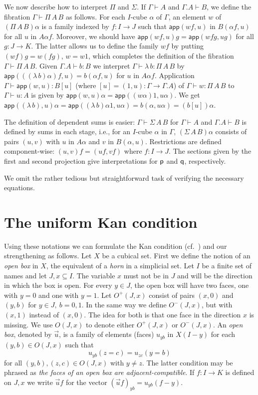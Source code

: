 \documentclass[10pt,a4paper]{article}
\newcommand{\app}{\mathsf{app}}
\newcommand{\pp}{{\sf p}}
\newcommand{\qq}{{\sf q}}
\begin{document}
We now describe how to interpret $\Pi$ and $\Sigma$. If $\Gamma\vdash
A$ and $\Gamma.A\vdash B$, we define the fibration $\Gamma\vdash
\Pi\,A\,B$ as follows.  For each $I$-cube $\alpha$ of $\Gamma$, an
element $w$ of $(\Pi\,A\,B)\alpha$ is a family indexed by $f:I\to J$
such that $\app(wf,u)$ in $B(\alpha f,u)$ for all $u$ in $A\alpha f$.
Moreover, we should have $\app(wf,u)g = \app(wfg,ug)$ for all $g:J\to
K$. The latter allows us to define the family $wf$ by putting $(wf)g =
w(fg)$, $w=w1$, which completes the definition of the fibration
$\Gamma\vdash \Pi\,A\,B$.  Given $\Gamma.A \vdash b : B$ we interpret
$\Gamma \vdash \lambda\,b : \Pi\,A\,B$ by $\app (((\lambda\, b)
\alpha) f, u) = b (\alpha f, u)$ for $u$ in $A \alpha f$.  Application
$\Gamma \vdash \app (w,u) : B [u]$ (where $[u] = (1, u) \colon \Gamma
\to \Gamma.A$) of $\Gamma \vdash w : \Pi\,A\,B$ to $\Gamma \vdash u :
A$ is given by $\app (w, u) \alpha = \app ((w\alpha) 1, u\alpha)$.  We
get $\app ((\lambda\,b), u) \alpha = \app ((\lambda\,b) \alpha 1, u
\alpha) = b (\alpha, u\alpha) = (b [u]) \alpha$.

The definition of dependent sums is easier: $\Gamma\vdash\Sigma\,A\,B$
for $\Gamma \vdash A$ and $\Gamma.A \vdash B$ is defined by sums in
each stage, i.e., for an $I$-cube $\alpha$ in $\Gamma$,
$(\Sigma\,A\,B)\alpha$ consists of pairs $(u,v)$ with $u$ in $A
\alpha$ and $v$ in $B (\alpha, u)$.  Restrictions are defined
component-wise: $(u,v)f = (u f, v f)$ where $f \colon I \to J$.  The
sections given by the first and second projection give interpretations
for $\pp$ and $\qq$, respectively.

We omit the rather tedious but straightforward task of verifying the
necessary equations.

\section{The uniform Kan condition}

 Using these notations we can formulate the Kan condition (cf.\ \cite{Kan})
and our strengthening as follows. Let $X$ be a cubical set.
First we define the notion of an \emph{open box} in $X$, the equivalent of a \emph{horn} in a simplicial set.
Let $I$ be a finite set of names and let $J,x \subseteq I$.
The variable $x$ must not be in $J$ and will be the direction in which the box is open.
For every $y\in J$, the open box will have two faces, one with $y=0$ and one with $y=1$.
Let $O^+(J,x)$ consist of pairs $(x,0)$ and $(y,b)$ for $y\in J,~b=0,1$.
In the same way we define $O^-(J,x)$, but with $(x,1)$ instead of $(x,0)$.
The idea for both is that one face in the direction $x$ is missing.
We use $O(J,x)$ to denote either $O^+(J,x)$ or $O^-(J,x)$.
An \emph{open box}, denoted by $\vec u$, is a family of elements (faces)
$u_{yb}$ in $X(I-y)$ for each $(y,b)\in O(J,x)$ such that 
$$u_{yb}(z = c) = u_{zc}(y = b)$$
for all $(y,b),(z,c)\in O(J,x)$ with $y\neq z$. 
The latter condition may be phrased as 
\emph{the faces of an open box are adjacent-compatible}.
If $f:I\to K$ is defined on $J,x$ we write
$\vec u f$ for the vector $(\vec u f)_{yb} = u_{yb} (f-y)$.
\end{document}
